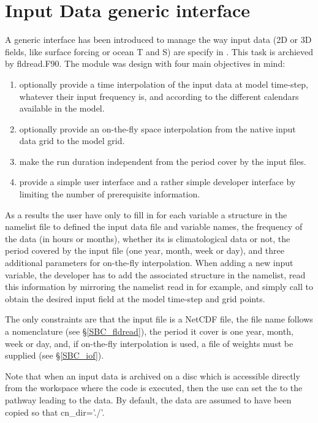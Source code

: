 \section{Input Data generic interface}
\label{SBC_input}

A generic interface has been introduced to manage the way input data (2D or 3D fields, 
like surface forcing or ocean T and S) are specify in \NEMO. This task is archieved by fldread.F90. 
The module was design with four main objectives in mind: 
\begin{enumerate}  
\item optionally provide a time interpolation of the input data at model time-step, 
whatever their input frequency is, and according to the different calendars available in the model.
\item optionally provide an on-the-fly space interpolation from the native input data grid to the model grid.
\item make the run duration independent from the period cover by the input files.
\item provide a simple user interface and a rather simple developer interface by limiting the 
 number of prerequisite information. 
\end{enumerate}  

As a results the user have only to fill in for each variable a structure in the namelist file 
to defined the input data file and variable names, the frequency of the data (in hours or months), 
whether its is climatological data or not, the period covered by the input file (one year, month, week or day), 
and three additional parameters for on-the-fly interpolation. When adding a new input variable, 
the developer has to add the associated structure in the namelist, read this information 
by mirroring the namelist read in  for example, and simply call  
to obtain the desired input field at the model time-step and grid points.

The only constraints are that the input file is a NetCDF file, the file name follows a nomenclature 
(see \S\ref{SBC_fldread}), the period it cover is one year, month, week or day, and, if on-the-fly 
interpolation is used, a file of weights must be supplied (see \S\ref{SBC_iof}).

Note that when an input data is archived on a disc which is accessible directly 
from the workspace where the code is executed, then the use can set the  
to the pathway leading to the data. By default, the data are assumed to have been 
copied so that cn\_dir='./'.

